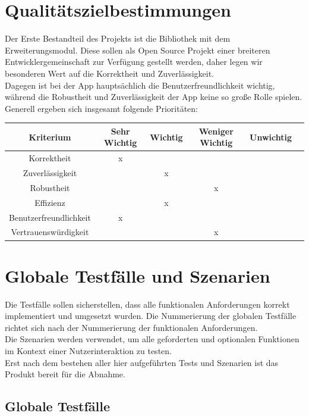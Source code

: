 \documentclass[a4paper,12pt]{article}
\begin{document}
\section{Qualitätszielbestimmungen}
Der Erste Bestandteil des Projekts ist die Bibliothek mit dem Erweiterungsmodul. Diese sollen als Open Source Projekt einer breiteren Entwicklergemeinschaft zur Verfügung gestellt werden, daher legen wir besonderen Wert auf die Korrektheit und Zuverlässigkeit.\\
Dagegen ist bei der App hauptsächlich die Benutzerfreundlichkeit wichtig, während die Robustheit und Zuverlässigkeit der App keine so große Rolle spielen. Generell ergeben sich insgesamt folgende Prioritäten:\\
\begin{tabular}[t]{|c|c|c|c|c|c|}
  \hline
  \textbf{Kriterium} & \textbf{Sehr Wichtig} & \textbf{Wichtig} & \textbf{Weniger Wichtig} & \textbf{Unwichtig}\\
  \hline
  \hline
  Korrektheit & x & & &\\ %
  \hline
  Zuverlässigkeit & & x & &\\ %
  \hline
  Robustheit & & & x &\\  %
  \hline
  Effizienz & & x & &\\ %
  \hline
  Benutzerfreundlichkeit & x & & &\\ %
  \hline
  Vertrauenswürdigkeit & & & x &\\ %
  \hline

\end{tabular}

\section{Globale Testfälle und Szenarien}
Die Testfälle sollen sicherstellen, dass alle funktionalen Anforderungen korrekt implementiert und umgesetzt wurden.
Die Nummerierung der globalen Testfälle richtet sich nach der Nummerierung der funktionalen Anforderungen.\\
Die Szenarien werden verwendet, um alle geforderten und optionalen Funktionen im Kontext einer Nutzerinteraktion zu testen.\\
Erst nach dem bestehen aller hier aufgeführten Tests und Szenarien ist das Produkt bereit für die Abnahme.
  \subsection{Globale Testfälle}
\end{document}
